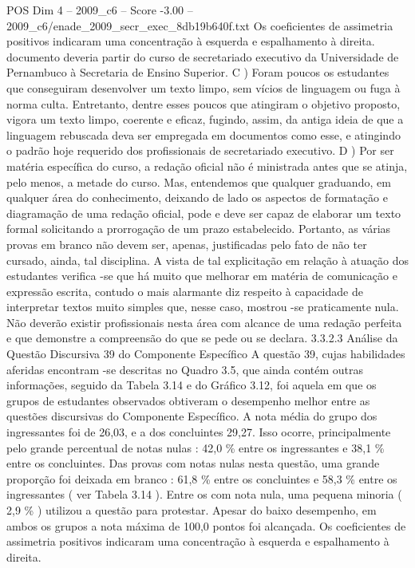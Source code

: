 \begin{textsample}{POS Dim 4 – 2009\_c6 – Score -3.00 – 2009\_c6/enade\_2009\_secr\_exec\_8db19b640f.txt}
Os coeficientes de assimetria positivos indicaram uma concentração à esquerda e espalhamento à direita. documento deveria partir do curso de secretariado executivo da Universidade de Pernambuco à Secretaria de Ensino Superior.
C ) Foram poucos os estudantes que conseguiram desenvolver um texto limpo, sem vícios de linguagem ou fuga à norma culta.
Entretanto, dentre esses poucos que atingiram o objetivo proposto, vigora um texto limpo, coerente e eficaz, fugindo, assim, da antiga ideia de que a linguagem rebuscada deva ser empregada em documentos como esse, e atingindo o padrão hoje requerido dos profissionais de secretariado executivo.
D ) Por ser matéria específica do curso, a redação oficial não é ministrada antes que se atinja, pelo menos, a metade do curso.
Mas, entendemos que qualquer graduando, em qualquer área do conhecimento, deixando de lado os aspectos de formatação e diagramação de uma redação oficial, pode e deve ser capaz de elaborar um texto formal solicitando a prorrogação de um prazo estabelecido.
Portanto, as várias provas em branco não devem ser, apenas, justificadas pelo fato de não ter cursado, ainda, tal disciplina.
A vista de tal explicitação em relação à atuação dos estudantes verifica -se que há muito que melhorar em matéria de comunicação e expressão escrita, contudo o mais alarmante diz respeito à capacidade de interpretar textos muito simples que, nesse caso, mostrou -se praticamente nula.
Não deverão existir profissionais nesta área com alcance de uma redação perfeita e que demonstre a compreensão do que se pede ou se declara. 3.3.2.3 Análise da Questão Discursiva 39 do Componente Específico A questão 39, cujas habilidades aferidas encontram -se descritas no Quadro 3.5, que ainda contém outras informações, seguido da Tabela 3.14 e do Gráfico 3.12, foi aquela em que os grupos de estudantes observados obtiveram o desempenho melhor entre as questões discursivas do Componente Específico.
A nota média do grupo dos ingressantes foi de 26,03, e a dos concluintes 29,27.
Isso ocorre, principalmente pelo grande percentual de notas nulas : 42,0 \% entre os ingressantes e 38,1 \% entre os concluintes.
Das provas com notas nulas nesta questão, uma grande proporção foi deixada em branco : 61,8 \% entre os concluintes e 58,3 \% entre os ingressantes ( ver Tabela 3.14 ).
Entre os com nota nula, uma pequena minoria ( 2,9 \% ) utilizou a questão para protestar.
Apesar do baixo desempenho, em ambos os grupos a nota máxima de 100,0 pontos foi alcançada.
Os coeficientes de assimetria positivos indicaram uma concentração à esquerda e espalhamento à direita.

\end{textsample}
